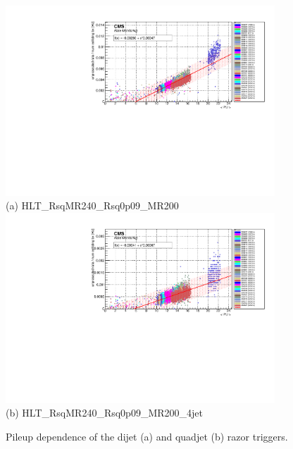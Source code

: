 \begin{figure}[ht!]
\centering 
\includegraphics[width=0.9\textwidth]{figs/hlt13TeV/linear/HLT_RsqMR240_Rsq0p09_MR200_instLumi_vs_rawRate.pdf}\\
(a) HLT\_RsqMR240\_Rsq0p09\_MR200 \\
\includegraphics[width=0.9\textwidth]{figs/hlt13TeV/linear/HLT_RsqMR240_Rsq0p09_MR200_4jet_instLumi_vs_rawRate.pdf}\\
(b) HLT\_RsqMR240\_Rsq0p09\_MR200\_4jet
\caption{\label{fig:HLTpileup1} Pileup dependence of the dijet (a) and
  quadjet (b) razor triggers.}
\end{figure}

